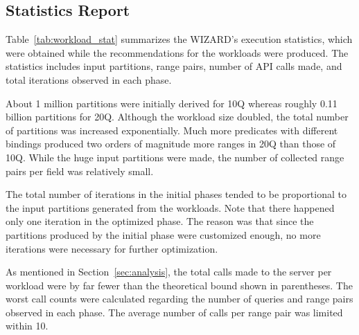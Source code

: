 \documentclass[runningheads]{comsis2}
\begin{document}
\subsection{Statistics Report}
\label{sec:stat}

Table~\ref{tab:workload_stat} summarizes the WIZARD's execution statistics, 
which were obtained while the recommendations for the \hbox{workloads} were produced. 
The statistics includes input partitions, 
range pairs, number of API calls made, and total iterations 
observed in each phase. 

About 1 million partitions were initially derived for 10Q whereas roughly 0.11 billion partitions for 20Q. 
Although the workload size doubled, the total number of partitions was increased exponentially. 
Much more predicates with different bindings produced two orders of magnitude more ranges in 20Q than those of 10Q. 
While the huge input partitions were made, the number of collected range pairs per field was relatively small. 

The total number of iterations in the initial phases 
tended to be proportional to the input \hbox{partitions} 
\hbox{generated} from the workloads. 
Note that there \hbox{happened} only one iteration in the optimized phase. 
The reason was that since the partitions produced by the \hbox{initial} phase were customized enough, 
no more \hbox{iterations} were \hbox{necessary} for further optimization. 

As mentioned in Section~\ref{sec:analysis}, the total calls made to 
the server per workload were by far fewer than the theoretical bound shown in parentheses. 
The worst call counts were calculated regarding the number of queries and range pairs observed in each phase. 
The average number of calls per range pair was limited within 10. %
\end{document}
